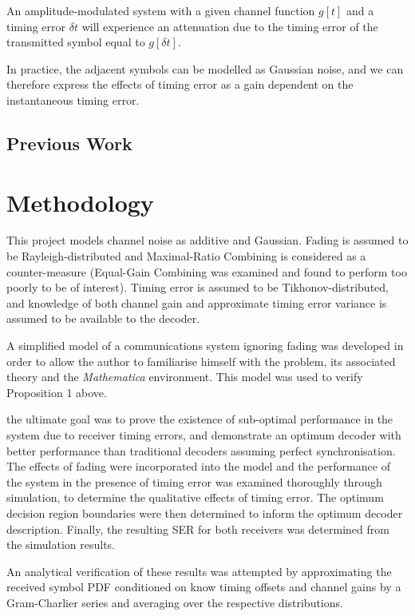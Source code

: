 \begin{propo}
An amplitude-modulated system with a given channel function $g[t]$ and a timing error $\delta t$ will experience an attenuation due to the timing error of the transmitted symbol equal to $g[\delta t]$.
\end{propo}

In practice, the adjacent symbols can be modelled as Gaussian noise, and we can therefore express the effects of timing error as a gain dependent on the instantaneous timing error. 

\section{Previous Work}


\chapter{Methodology}

This project models channel noise as additive and Gaussian. Fading is assumed to be Rayleigh-distributed and Maximal-Ratio Combining is considered as a counter-measure (Equal-Gain Combining was examined and found to perform too poorly to be of interest). Timing error is assumed to be Tikhonov-distributed, and knowledge of both channel gain and approximate timing error variance is assumed to be available to the decoder.

A simplified model of a communications system ignoring fading was developed in order to allow the author to familiarise himself with the problem, its associated theory and the \emph{Mathematica} environment. This model was used to verify Proposition 1 above.

the ultimate goal was to prove the existence of sub-optimal performance in the system due to receiver timing errors, and demonstrate an optimum decoder with better performance than traditional decoders assuming perfect synchronisation. The effects of fading were incorporated into the model and the performance of the system in the presence of timing error was examined thoroughly through simulation, to determine the qualitative effects of timing error. The optimum decision region boundaries were then determined to inform the optimum decoder description. Finally, the resulting SER for both receivers was determined from the simulation results.

An analytical verification of these results was attempted by approximating the received symbol PDF conditioned on know timing offsets and channel gains by a Gram-Charlier series and averaging over the respective distributions.

